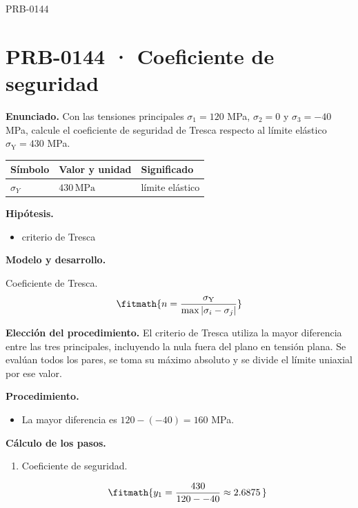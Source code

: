 \begin{studiumworked}{PRB-0144}

\section{PRB-0144 · Coeficiente de seguridad}

\textbf{Enunciado.} Con las tensiones principales $\sigma_1 = 120$ MPa, $\sigma_2 = 0$ y $\sigma_3 = -40$ MPa, calcule el coeficiente de seguridad de Tresca respecto al límite elástico $\sigma_{\mathrm{Y}} = 430$ MPa.

\par\medskip\noindent\begin{tabular}{@{}p{.18\linewidth}p{.26\linewidth}p{.48\linewidth}@{}}
\toprule Símbolo & Valor y unidad & Significado\\\midrule
$\sigma_{Y}$ & $430\,\mathrm{MPa}$ & límite elástico\\
\bottomrule\end{tabular}\par\medskip

\textbf{Hipótesis.}\begin{itemize}\item criterio de Tresca\end{itemize}

\textbf{Modelo y desarrollo.}

Coeficiente de Tresca.\[\fitmath{n = \frac{\sigma_{\mathrm{Y}}}{\max|\sigma_i - \sigma_j|}}\]

\textbf{Elección del procedimiento.} El criterio de Tresca utiliza la mayor diferencia entre las tres principales, incluyendo la nula fuera del plano en tensión plana. Se evalúan todos los pares, se toma su máximo absoluto y se divide el límite uniaxial por ese valor.

\textbf{Procedimiento.}\begin{itemize}\item La mayor diferencia es $120 - (-40) = 160$ MPa.\end{itemize}

\textbf{Cálculo de los pasos.}

\begin{enumerate}

\item Coeficiente de seguridad.

\[\fitmath{y_{1}=\frac{430}{120--40}\approx 2.6875\,}\]

\end{enumerate}


\end{studiumworked}
